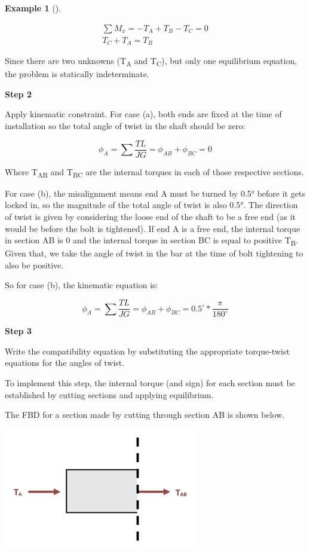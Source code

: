 \documentclass[
  letterpaper,
  DIV=11,
  numbers=noendperiod]{scrreprt}
\theoremstyle{definition}
\newtheorem{example}{Example}[chapter]
\theoremstyle{remark}
\begin{document}
\begin{tcolorbox}
\begin{example}[]
\begin{tcolorbox}
\[
\begin{gathered}
\sum M_x=-T_A+T_B-T_C=0 \\
T_C+T_A=T_B
\end{gathered}
\]

Since there are two unknowns (T\textsubscript{A} and
T\textsubscript{C}), but only one equilibrium equation, the problem is
statically indeterminate.

\textbf{Step 2}

Apply kinematic constraint. For case (a), both ends are fixed at the
time of installation so the total angle of twist in the shaft should be
zero:

\[
\phi_A=\sum \frac{T L}{J G}=\phi_{A B}+\phi_{B C}=0
\]

Where T\textsubscript{AB} and T\textsubscript{BC} are the internal
torques in each of those respective sections.

For case (b), the misalignment means end A must be turned by 0.5° before
it gets locked in, so the magnitude of the total angle of twist is also
0.5°. The direction of twist is given by considering the loose end of
the shaft to be a free end (as it would be before the bolt is
tightened). If end A is a free end, the internal torque in section AB is
0 and the internal torque in section BC is equal to positive
T\textsubscript{B}. Given that, we take the angle of twist in the bar at
the time of bolt tightening to also be positive.

So for case (b), the kinematic equation is:

\[
\phi_A=\sum \frac{TL}{JG}=\phi_{A B}+\phi_{BC}=0.5^{\circ} * \frac{\pi}{180^{\circ}}
\]

\textbf{Step 3}

Write the compatibility equation by substituting the appropriate
torque-twist equations for the angles of twist.

To implement this step, the internal torque (and sign) for each section
must be established by cutting sections and applying equilibrium.

The FBD for a section made by cutting through section AB is shown below.

\begin{center}
\includegraphics[width=3.30208in,height=\textheight]{images/CH6 PNGs/example 6.4 part 4.png}
\end{center}


\end{tcolorbox}
\end{example}
\end{tcolorbox}
\end{document}
